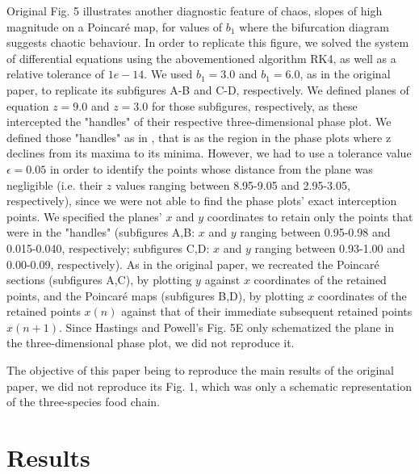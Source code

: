 Original Fig. 5 illustrates another diagnostic feature of chaos, slopes of high magnitude on
a Poincaré map, for values of $b_1$ where the bifurcation diagram suggests chaotic
behaviour. In order to replicate this figure, we solved the system of differential
equations using the abovementioned algorithm RK4, as well as a relative tolerance of
$1e-14$. We used $b_1 = 3.0$ and $b_1 = 6.0$, as in the original paper, to replicate its
subfigures A-B and C-D, respectively.
We defined planes of equation $z = 9.0$ and $z = 3.0$ for those subfigures, respectively,
as these intercepted the "handles" of their respective three-dimensional phase plot.
We defined those "handles" as in \citeauthor{hastings1991}, that is as the region in the
phase plots where z declines from its maxima to its minima.
However, we had to use a tolerance value $\epsilon = 0.05$ in order to identify the points
whose distance from the plane was negligible (i.e. their $z$ values ranging between
8.95-9.05 and 2.95-3.05, respectively), since we were not able to find the phase plots'
exact interception points.
We specified the planes' $x$ and $y$ coordinates to retain only the points that were in
the "handles" (subfigures A,B: $x$ and $y$ ranging between 0.95-0.98 and 0.015-0.040,
respectively; subfigures C,D: $x$ and $y$ ranging between 0.93-1.00 and 0.00-0.09,
respectively).
As in the original paper, we recreated the Poincaré sections (subfigures A,C), by
plotting $y$ against $x$ coordinates of the retained points, and the Poincaré maps
(subfigures B,D), by plotting $x$ coordinates of the retained points $x(n)$
against that of their immediate subsequent retained points $x(n+1)$. Since Hastings and
Powell's Fig. 5E only schematized the plane in the three-dimensional phase plot, we
did not reproduce it.

The objective of this paper being to reproduce the main results of the original paper, we
did not reproduce its Fig. 1, which was only a schematic representation of the
three-species food chain.

\section{Results}

